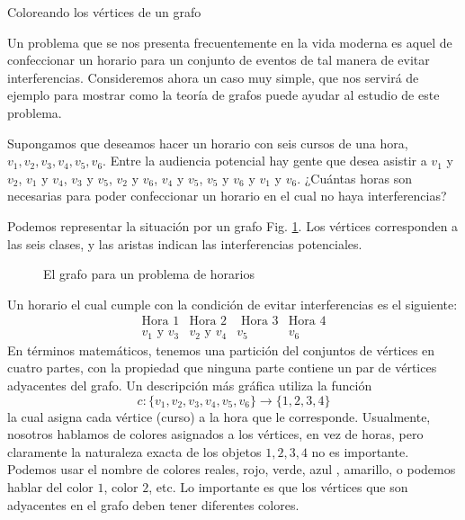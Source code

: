 \begin{section}{Coloreando los vértices de un grafo} \label{5.6}

Un problema que se nos presenta frecuentemente en la vida moderna es aquel de confeccionar un horario para un conjunto de eventos de tal manera de evitar interferencias. Consideremos ahora un caso muy simple, que nos servirá de ejemplo para mostrar como la teoría de grafos puede ayudar al estudio de este problema.

Supongamos que deseamos hacer un horario con seis cursos de una hora, $v_1,v_2,v_3,v_4,v_5,v_6$. Entre la audiencia potencial hay gente que desea asistir a $v_1$ y $v_2$, $v_1$ y $v_4$, $v_3$ y $v_5$, $v_2$ y $v_6$, $v_4$ y $v_5$, $v_5$ y $v_6$ y $v_1$ y $v_6$. ¿Cuántas horas son necesarias para poder confeccionar un horario en el cual no haya interferencias?

Podemos representar la situación por un grafo Fig. \ref{f5.10}. Los vértices corresponden a las seis clases, y las aristas indican las interferencias potenciales.

\begin{figure}[ht]
    \begin{center}
    \end{center}
\caption{El grafo para un problema de horarios} \label{f5.10}
\end{figure}

Un horario el cual cumple con la condición de evitar interferencias es el siguiente:
$$
\begin{matrix}
\text{Hora 1} & \text{Hora 2} &\text{ Hora 3}& \text{Hora 4} \\
v_1 \text{ y } v_3 & v_2 \text{ y } v_4 & v_5 & v_6
\end{matrix}
$$
En términos matemáticos, tenemos una partición del conjuntos de vértices en cuatro partes, con la propiedad que ninguna parte contiene un par de vértices adyacentes del grafo. Un descripción más gráfica utiliza la función 
$$
c: \{ v_1,v_2,v_3,v_4,v_5,v_6\} \to  \{1,2,3,4\}
$$
la cual asigna cada vértice (curso) a la hora que le corresponde. Usualmente, nosotros hablamos de colores asignados a los vértices, en vez de horas, pero claramente la naturaleza exacta de los objetos $1,2,3,4$ no es importante. Podemos usar el nombre de colores reales, rojo, verde, azul , amarillo, o podemos hablar del
color $1$, color $2$, etc. Lo importante es que los vértices que son adyacentes en el grafo deben tener diferentes colores.


\end{section}
